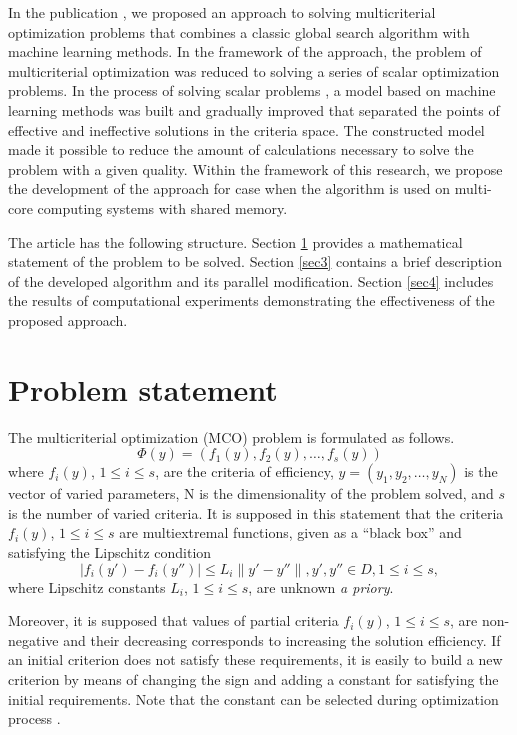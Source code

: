 \documentclass[runningheads]{llncs}
\begin{document}
In the publication \cite{Konnov2025}, we proposed an approach to solving multicriterial optimization problems that combines a classic global search algorithm with machine learning methods. In the framework of the approach, the problem of multicriterial optimization was reduced to solving a series of scalar optimization problems. In the process of solving scalar problems , a model based on machine learning methods was built and gradually improved that separated the points of effective and ineffective solutions in the criteria space. The constructed model made it possible to reduce the amount of calculations necessary to solve the problem with a given quality. Within the framework of this research, we propose the development of the approach for case when the algorithm is used on multi-core computing systems with shared memory.

The article has the following structure. Section \ref{sec2} provides a mathematical statement of the problem to be solved. Section \ref{sec3} contains a brief description of the developed algorithm and its parallel modification. Section \ref{sec4} includes the results of computational experiments demonstrating the effectiveness of the proposed approach.

\section{Problem statement}
\label{sec2}

The multicriterial optimization (MCO) problem is formulated as follows.
\begin{equation}
\label{eq:01}
  \Phi(y) = (f_1 (y),f_2 (y), \dots, f_s(y))
\end{equation}
where $f_i(y)$, $1 \leq i \leq s$, are the criteria of efficiency, $y=(y_1,y_2,\dots,y_N)$ is the vector of varied parameters, N is the dimensionality of the problem solved, and $s$ is the number of varied  criteria. It is supposed in this statement that the criteria $f_i(y)$, $1 \leq i \leq s$ are multiextremal functions, given as a ``black box'' and satisfying the Lipschitz condition
\begin{equation}
\label{eq:02}
|f_i (y') - f_i (y'')| \leq L_i \|y' - y''\| ,y',y'' \in D, 1 \leq i \leq s,
\end{equation}
where Lipschitz constants $L_i$, $1 \leq i \leq s$, are unknown \textit{a priory}.

Moreover, it is supposed that values of partial criteria $f_i(y)$, $1 \leq i \leq s$, are non-negative and their decreasing corresponds to increasing the solution efficiency. If an initial criterion does not satisfy these requirements, it is easily to build a new criterion by means of changing the sign and adding a constant for satisfying the initial requirements. Note that the constant can be selected during optimization process \cite{Konnov2025}.
\end{document}

